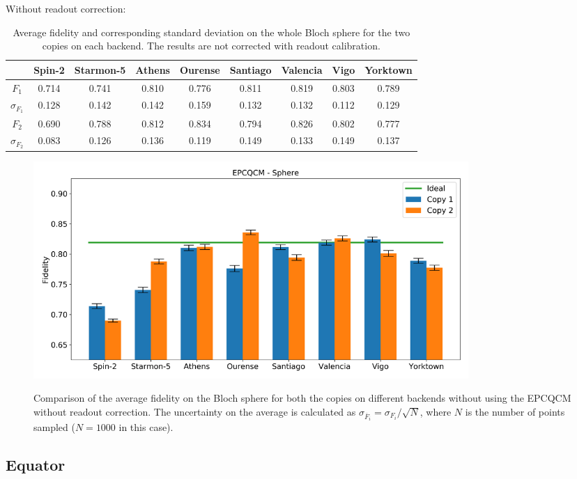 Without readout correction:
\begin{table}[H]
    \centering
    \begin{tabular}{|c|c|c|c|c|c|c|c|c|}
    \hline
    \textbf{} & \textbf{Spin-2} & \textbf{Starmon-5} & \textbf{Athens} & \textbf{Ourense} & \textbf{Santiago} & \textbf{Valencia} & \textbf{Vigo} & \textbf{Yorktown} \\ \hline
    $F_1$              & 0.714  & 0.741 & 0.810 & 0.776 & 0.811 & 0.819 & 0.803 & 0.789 \\ \hline
    $\sigma_{F_1}$     & 0.128  & 0.142 & 0.142 & 0.159 & 0.132 & 0.132 & 0.112 & 0.129 \\ \hline
    $F_2$              & 0.690  & 0.788 & 0.812 & 0.834 & 0.794 & 0.826 & 0.802 & 0.777 \\ \hline
    $\sigma_{F_2}$     & 0.083  & 0.126 & 0.136 & 0.119 & 0.149 & 0.133 & 0.149 & 0.137 \\ \hline
    \end{tabular}
    \caption{Average fidelity and corresponding standard deviation on the whole Bloch sphere for the two copies on each backend. The results are not corrected with readout calibration.}
    \label{tab:results_epcqcm_fullsphere_not_corrected}
\end{table}
\begin{figure}[H]
  \centering
          \includegraphics[width=0.8\textwidth]{Figures/Economical/Histograms/histo_sphere.png}
      \label{fig:epc_histo_sphere_not_corrected}
      \caption{Comparison of the average fidelity on the Bloch sphere for both the copies on different backends without using the EPCQCM without readout correction. The uncertainty on the average is calculated as $\sigma_{\overline{F}_i}=\sigma_{F_i}/\sqrt{N}$, where $N$ is the number of points sampled ($N=1000$ in this case).}
\end{figure}

\subsection{Equator}


